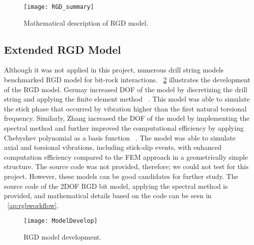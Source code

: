 \begin{figure}[!hbt]
  \centering
  \texttt{[image: RGD\_summary]}
  \caption[Mathematical description of RGD model]{Mathematical description of RGD model.}\label{figure_RGD_Summary}
\end{figure}
\subsection{Extended RGD Model}
Although it was not applied in this project, numerous drill string models benchmarked RGD model for bit-rock interactions. \figurename~\ref{model_develop_figure} illustrates the development of the RGD model. Germay increased DOF of the model by discretizing the drill string and applying the finite element method ~\cite{ref:germay2009a}. This model was able to simulate the stick phase that occurred by vibration higher than the first natural torsional frequency. Similarly, Zhang increased the DOF of the model by implementing the spectral method and further improved the computational efficiency by applying Chebyshev polynomial as a basis function ~\cite{ref:zhang2020a}. The model was able to simulate axial and torsional vibrations, including stick-slip events, with enhanced computation efficiency compared to the FEM approach in a geometrically simple structure. The source code was not provided, therefore; we could not test for this project. However, these models can be good candidates for further study. The source code of the 2DOF RGD bit model, applying the spectral method is provided, and mathematical details based on the code can be seen in \appendixname~\ref{ap:rgbworkflow}.

\begin{figure}[ht]
  \centering
  \texttt{[image: ModelDevelop]}
  \caption[RGD model development]{RGD model development.}\label{model_develop_figure}
\end{figure} 